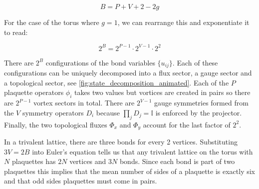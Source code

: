 \[B = P + V + 2 - 2g\]

For the case of the torus where \(g = 1\), we can rearrange this and exponentiate it to read:

\[2^B = 2^{P-1}\cdot 2^{V-1} \cdot 2^2\]

There are \(2^B\) configurations of the bond variables \(\{u_{ij}\}\). Each of these configurations can be uniquely decomposed into a flux sector, a gauge sector and a topological sector, see \cref{fig:state_decomposition_animated}. Each of the \(P\) plaquette operators \(\phi_i\) takes two values but vortices are created in pairs so there are \(2^{P-1}\) vortex sectors in total. There are \(2^{V-1}\) gauge symmetries formed from the \(V\) symmetry operators \(D_i\) because \(\prod_{j} D_j = \mathbb{I}\) is enforced by the projector. Finally, the two topological fluxes \(\Phi_x\) and \(\Phi_y\) account for the last factor of \(2^2\).

In a trivalent lattice, there are three bonds for every 2 vertices. Substituting \(3V = 2B\) into Euler's equation tells us that any trivalent lattice on the torus with \(N\) plaquettes has \(2N\) vertices and \(3N\) bonds. Since each bond is part of two plaquettes this implies that the mean number of sides of a plaquette is exactly six and that odd sides plaquettes must come in pairs.
